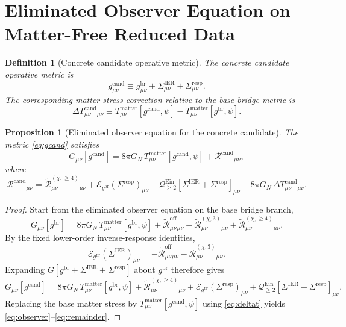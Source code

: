 \documentclass[11pt]{article}
\newcommand{\ObserverMetric}{g^{\mathrm{br}}}
\newcommand{\CandidateMetric}{g^{\mathrm{cand}}}
\newcommand{\BaseShift}{\Sigma^{\mathrm{IER}}}
\newcommand{\ResponseShift}{\Sigma^{\mathrm{resp}}}
\newcommand{\ReOff}{\widetilde{\mathcal R}_{\mu\nu}^{\mathrm{off}}}
\newcommand{\ReLongThree}{\widetilde{\mathcal R}_{\mu\nu}^{(\chi,3)}}
\newcommand{\ReLongFour}{\widetilde{\mathcal R}_{\mu\nu}^{(\chi,\ge 4)}}
\newcommand{\DeltaTCand}{\Delta T_{\mu\nu}^{\mathrm{cand}}}
\newcommand{\ObserverRemCand}{\mathcal R^{\mathrm{cand}}}
\newcommand{\EinLin}{\mathcal E_{\ObserverMetric}}
\newcommand{\EinQuad}{\mathcal Q_{\ge 2}^{\mathrm{Ein}}}
\newtheorem{definition}{Definition}
\newtheorem{proposition}{Proposition}
\begin{document}
\section{Eliminated Observer Equation on Matter-Free Reduced Data}

\begin{definition}[Concrete candidate operative metric]
\label{def:metric}
The concrete candidate operative metric is
\begin{equation}
\CandidateMetric_{\mu\nu}
\equiv
\ObserverMetric_{\mu\nu}
+\BaseShift_{\mu\nu}
+\ResponseShift_{\mu\nu}.
\label{eq:gcand}
\end{equation}
The corresponding matter-stress correction relative to the base bridge metric is
\begin{equation}
\DeltaTCand{}_{\mu\nu}
\equiv
T_{\mu\nu}^{\mathrm{matter}}[\CandidateMetric,\psi]
-T_{\mu\nu}^{\mathrm{matter}}[\ObserverMetric,\psi].
\label{eq:deltat}
\end{equation}
\end{definition}

\begin{proposition}[Eliminated observer equation for the concrete candidate]
\label{prop:observer}
The metric \eqref{eq:gcand} satisfies
\begin{equation}
G_{\mu\nu}[\CandidateMetric]
=
8\pi G_N\,T_{\mu\nu}^{\mathrm{matter}}[\CandidateMetric,\psi]
+\ObserverRemCand{}_{\mu\nu},
\label{eq:observer}
\end{equation}
where
\begin{equation}
\ObserverRemCand{}_{\mu\nu}
=
\ReLongFour{}_{\mu\nu}
+\EinLin(\ResponseShift)_{\mu\nu}
+\EinQuad[\BaseShift+\ResponseShift]_{\mu\nu}
-8\pi G_N\,\DeltaTCand{}_{\mu\nu}.
\label{eq:remainder}
\end{equation}
\end{proposition}

\begin{proof}
Start from the eliminated observer equation on the base bridge branch,
\[
G_{\mu\nu}[\ObserverMetric]
=
8\pi G_N\,T_{\mu\nu}^{\mathrm{matter}}[\ObserverMetric,\psi]
+\ReOff{}_{\mu\nu}
+\ReLongThree{}_{\mu\nu}
+\ReLongFour{}_{\mu\nu}.
\]
By the fixed lower-order inverse-response identities,
\[
\EinLin(\BaseShift)_{\mu\nu}
=
-\ReOff{}_{\mu\nu}
-\ReLongThree{}_{\mu\nu}.
\]
Expanding \(G[\ObserverMetric+\BaseShift+\ResponseShift]\) about \(\ObserverMetric\) therefore gives
\[
G_{\mu\nu}[\CandidateMetric]
=
8\pi G_N\,T_{\mu\nu}^{\mathrm{matter}}[\ObserverMetric,\psi]
+\ReLongFour{}_{\mu\nu}
+\EinLin(\ResponseShift)_{\mu\nu}
+\EinQuad[\BaseShift+\ResponseShift]_{\mu\nu}.
\]
Replacing the base matter stress by \(T_{\mu\nu}^{\mathrm{matter}}[\CandidateMetric,\psi]\) using \eqref{eq:deltat} yields \eqref{eq:observer}--\eqref{eq:remainder}.
\end{proof}
\end{document}
